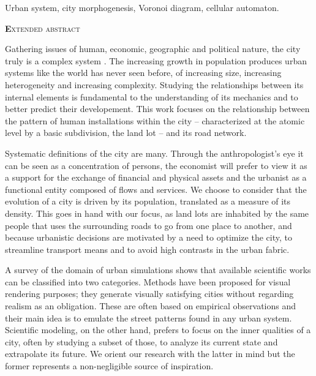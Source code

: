 \documentclass[12pt]{article}
\begin{document}
{Urban system, city morphogenesis, Voronoi diagram, cellular automaton.}

\begin{center}
  {\scshape\textbf Extended abstract}
\end{center}

Gathering issues of human, economic, geographic and political nature,
the city truly is a complex system \cite{Batty2011}. The increasing
growth in population produces urban systems like the world has never
seen before, of increasing size, increasing heterogeneity and
increasing complexity. Studying the relationships between its internal
elements is fundamental to the understanding of its mechanics and to
better predict their developement. This work focuses on the
relationship between the pattern of human installations within the
city -- characterized at the atomic level by a basic subdivision, the
land lot -- and its road network.

Systematic definitions of the city are many. Through the
anthropologist's eye it can be seen as a concentration of persons, the
economist will prefer to view it as a support for the exchange of
financial and physical assets and the urbanist as a functional entity
composed of flows and services. We choose to consider that the
evolution of a city is driven by its population, translated as a
measure of its density. This goes in hand with our focus, as land lots
are inhabited by the same people that uses the surrounding roads to go
from one place to another, and because urbanistic decisions are
motivated by a need to optimize the city, to streamline transport
means and to avoid high contrasts in the urban fabric.

A survey of the domain of urban simulations shows that available
scientific works can be classified into two categories. Methods have
been proposed for visual rendering purposes; they generate visually
satisfying cities without regarding realism as an obligation. These
are often based on empirical observations and their main idea is to
emulate the street patterns found in any urban system. Scientific
modeling, on the other hand, prefers to focus on the inner qualities
of a city, often by studying a subset of those, to analyze its current
state and extrapolate its future. We orient our research with the
latter in mind but the former represents a non-negligible source of
inspiration.
\end{document}
